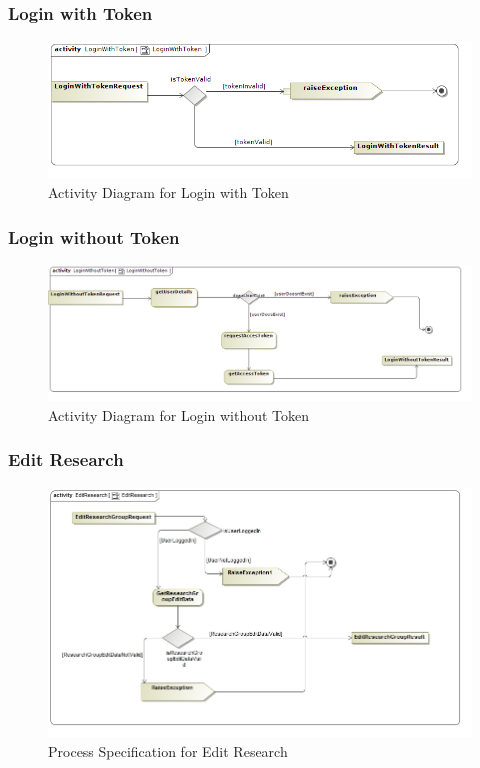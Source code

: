 \documentclass[a4paper,10pt]{article}
\begin{document}
\subsubsection{Login with Token}
	\begin{figure}[H]
		\includegraphics[scale=0.5]{LoginWithTokenAct}
	\caption{Activity Diagram for Login with Token}
	\end{figure}

\subsubsection{Login without Token}
	\begin{figure}[H]
		\includegraphics[scale=0.5]{LoginWithoutTokenAct}
	\caption{Activity Diagram for Login without Token}
	\end{figure}

\subsubsection{Edit Research}
	\begin{figure}[H]
	\includegraphics[scale=0.5]{ActEditResearch}
	\caption{Process Specification for Edit Research}
	\end{figure}
	
\end{document}

